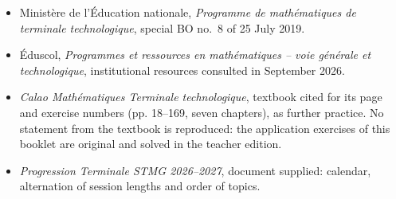 \begin{itemize}
\item Ministère de l'Éducation nationale, \emph{Programme de mathématiques de terminale technologique}, special BO no.~8 of 25 July 2019.
\item Éduscol, \emph{Programmes et ressources en mathématiques -- voie générale et technologique}, institutional resources consulted in September 2026.
\item \emph{Calao Mathématiques Terminale technologique}, textbook cited for its page and exercise numbers (pp. 18--169, seven chapters), as further practice. No statement from the textbook is reproduced: the application exercises of this booklet are original and solved in the teacher edition.
\item \emph{Progression Terminale STMG 2026--2027}, document supplied: calendar, alternation of session lengths and order of topics.
\end{itemize}
